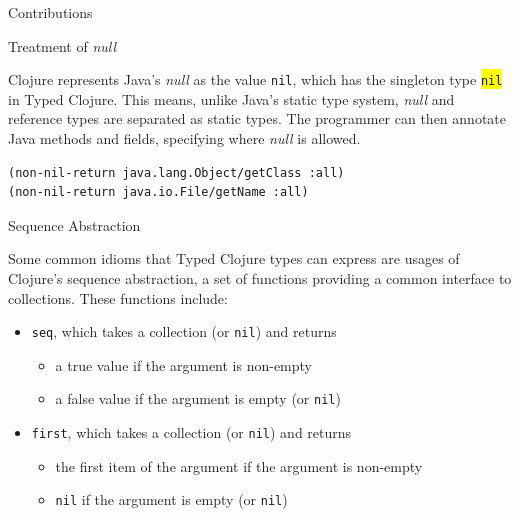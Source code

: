 \documentclass[landscape,final,a0paper,fontscale=0.277]{baposter}
\begin{document}
\begin{poster}
\begin{posterbox}[name=contribution,column=0,below=problem]{Contributions}
\begin{itemize}
\end{itemize}

\end{posterbox}

\begin{posterbox}[name=nulltreatment,column=0,above=bottom]{Treatment of \emph{null}}

Clojure represents Java's \emph{null} as the value \lstinline{nil},
which has the singleton type \colorbox{yellow}{\lstinline|nil|} in Typed Clojure.
This means, unlike Java's static type system, \emph{null} and reference types are separated as static types.
The programmer can then annotate Java methods and fields, specifying where \emph{null} is allowed.

\begin{lstlisting}[caption={Annotating Java methods that never return \emph{null}}]
(non-nil-return java.lang.Object/getClass :all)
(non-nil-return java.io.File/getName :all)
\end{lstlisting}
\end{posterbox}

\begin{posterbox}[name=sequenceabs,column=1]{Sequence Abstraction}

Some common idioms that Typed Clojure types can express
are usages of Clojure's sequence abstraction, a set of functions providing a common
interface to collections.
These functions include:

\begin{itemize}
\item \lstinline|seq|, which takes a collection (or \lstinline|nil|) and returns
   \begin{itemize}
      \item a true value if the argument is non-empty
      \item a false value if the argument is empty (or \lstinline|nil|)
   \end{itemize}
\item \lstinline|first|, which takes a collection (or \lstinline|nil|) and returns
   \begin{itemize}
      \item the first item of the argument if the argument is non-empty
      \item \lstinline|nil| if the argument is empty (or \lstinline|nil|)
    \end{itemize}
\end{itemize}


\end{posterbox}
\end{poster}
\end{document}

